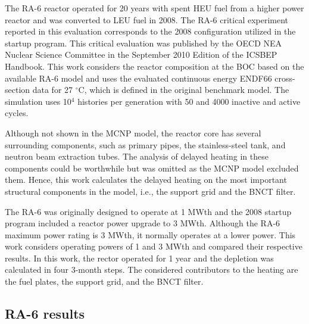 The RA-6 reactor operated for 20 years with spent \gls*{HEU} fuel from a higher power reactor and was converted to \gls*{LEU} fuel in 2008.
The RA-6 critical experiment reported in this evaluation corresponds to the 2008 configuration utilized in the startup program.
This critical evaluation was published by the OECD NEA Nuclear Science Committee in the September 2010 Edition of the ICSBEP Handbook.
This work considers the reactor composition at the \gls*{BOC} based on the available RA-6 model and uses the evaluated continuous energy ENDF66 cross-section data for 27 $^{\circ}$C, which is defined in the original benchmark model.
The simulation uses 10$^4$ histories per generation with 50 and 4000 inactive and active cycles.

Although not shown in the MCNP model, the reactor core has several surrounding components, such as primary pipes, the stainless-steel tank, and neutron beam extraction tubes.
The analysis of delayed heating in these components could be worthwhile but was omitted as the MCNP model excluded them.
Hence, this work calculates the delayed heating on the most important structural components in the model, i.e., the support grid and the BNCT filter.

The RA-6 was originally designed to operate at 1 MWth and the 2008 startup program included a reactor power upgrade to 3 MWth.
Although the RA-6 maximum power rating is 3 MWth, it normally operates at a lower power.
This work considers operating powers of 1 and 3 MWth and compared their respective results.
In this work, the rector operated for 1 year and the depletion was calculated in four 3-month steps.
The considered contributors to the heating are the fuel plates, the support grid, and the BNCT filter.


\subsection{RA-6 results}

